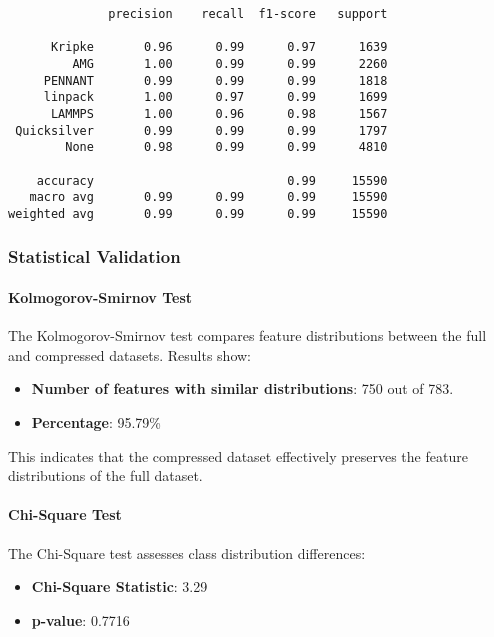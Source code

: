 \documentclass{article}
\begin{document}
\begin{verbatim}
              precision    recall  f1-score   support

      Kripke       0.96      0.99      0.97      1639
         AMG       1.00      0.99      0.99      2260
     PENNANT       0.99      0.99      0.99      1818
     linpack       1.00      0.97      0.99      1699
      LAMMPS       1.00      0.96      0.98      1567
 Quicksilver       0.99      0.99      0.99      1797
        None       0.98      0.99      0.99      4810

    accuracy                           0.99     15590
   macro avg       0.99      0.99      0.99     15590
weighted avg       0.99      0.99      0.99     15590
\end{verbatim}

\subsubsection{Statistical Validation}

\paragraph{Kolmogorov-Smirnov Test}

The Kolmogorov-Smirnov test compares feature distributions between the full and compressed datasets. Results show:

\begin{itemize}
    \item \textbf{Number of features with similar distributions}: 750 out of 783.
    \item \textbf{Percentage}: 95.79\%
\end{itemize}

This indicates that the compressed dataset effectively preserves the feature distributions of the full dataset.

\paragraph{Chi-Square Test}

The Chi-Square test assesses class distribution differences:

\begin{itemize}
    \item \textbf{Chi-Square Statistic}: 3.29
    \item \textbf{p-value}: 0.7716
\end{itemize}
\end{document}
